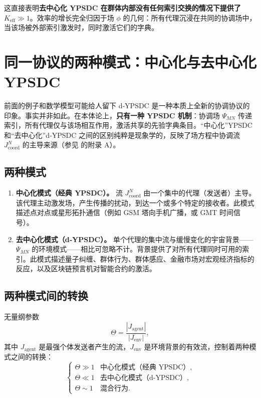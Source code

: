 \documentclass[11pt,a4paper]{article}
\begin{document}
	这直接表明\textbf{去中心化 YPSDC 在群体内部没有任何索引交换的情况下提供了 \(K_{\mathrm{eff}} \gg 1\)}。效率的增长完全归因于场 \(\phi\) 的几何：所有代理沉浸在共同的协调场中，当该场被外部索引激发时，同时激活它们的字典。
	
	\section{同一协议的两种模式：中心化与去中心化 YPSDC}
	\label{sec:two-regimes}
	
	前面的例子和数学模型可能给人留下 d‑YPSDC 是一种本质上全新的协调协议的印象。事实并非如此。在本体论上，\textbf{只有一种 YPSDC 机制}：协调场 \(\Psi_{MN}\) 传递索引，所有代理仅与该场相互作用，激活共享的先验字典条目。“中心化”YPSDC 和“去中心化”d‑YPSDC 之间的区别纯粹是现象学的，反映了场方程中协调流 \(J^{N}_{\mathrm{coord}}\) 的主导来源（参见 \cite{YUCT} 的附录 A）。
	
	\subsection{两种模式}
	\begin{enumerate}[leftmargin=*, label=\textbf{(\arabic*)}]
		\item \textbf{中心化模式（经典 YPSDC）。} 流 \(J^{N}_{\mathrm{coord}}\) 由一个集中的代理（发送者）主导。该代理主动激发场，产生传播的扰动，到达一个或多个特定的接收者。此模式描述点对点或星形拓扑通信（例如 GSM 塔向手机广播，或 GMT 时间信号）。
		
		\item \textbf{去中心化模式（d‑YPSDC）。} 单个代理的集中流与缓慢变化的宇宙背景——\(\Psi_{MN}\) 的环境模式——相比可忽略不计。背景提供了对所有代理同时可用的索引。此模式描述量子纠缠、群体行为、群体感应、金融市场对宏观经济指标的反应，以及区块链预言机对智能合约的激活。
	\end{enumerate}
	
	\subsection{两种模式间的转换}
	无量纲参数
	\[
	\Theta = \frac{|J_{\mathrm{agent}}|}{|J_{\mathrm{env}}|},
	\]
	其中 \(J_{\mathrm{agent}}\) 是最强个体发送者产生的流，\(J_{\mathrm{env}}\) 是环境背景的有效流，控制着两种模式之间的转换：
	\[
	\begin{cases}
		\Theta \gg 1 & \text{中心化模式（经典 YPSDC）}, \\
		\Theta \ll 1 & \text{去中心化模式（d‑YPSDC）}, \\
		\Theta \sim 1 & \text{混合行为}.
	\end{cases}
	\]
	
\end{document}
